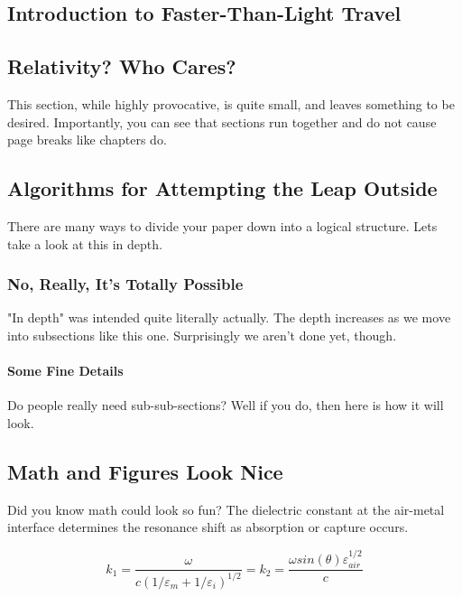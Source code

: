 \documentclass[master,tocprelim]{unrthesis}
\begin{document}
\begin{manuscript}

\chapter{Introduction to Faster-Than-Light Travel}

\section{Relativity? Who Cares?}
This section, while highly provocative, is quite small, and leaves something to be desired. Importantly, you can see that sections run together and do not cause page breaks like chapters do.

\section{Algorithms for Attempting the Leap Outside}
There are many ways to divide your paper down into a logical structure. Lets take a look at this in depth.

\subsection{No, Really, It's Totally Possible}
"In depth" was intended quite literally actually. The depth increases as we move into subsections like this one. Surprisingly we aren't done yet, though.

\subsubsection{Some Fine Details}
Do people really need sub-sub-sections? Well if you do, then here is how it will look.

\section{Math and Figures Look Nice}
Did you know math could look so fun? The dielectric constant at the air-metal interface
determines the resonance shift as absorption or capture occurs.

\begin{equation}
k_1=\frac{\omega }{c({1/\varepsilon_m + 1/\varepsilon_i})^{1/2}}=k_2=\frac{\omega
sin(\theta)\varepsilon_{air}^{1/2}}{c}
\end{equation}


\end{manuscript}
\end{document}
